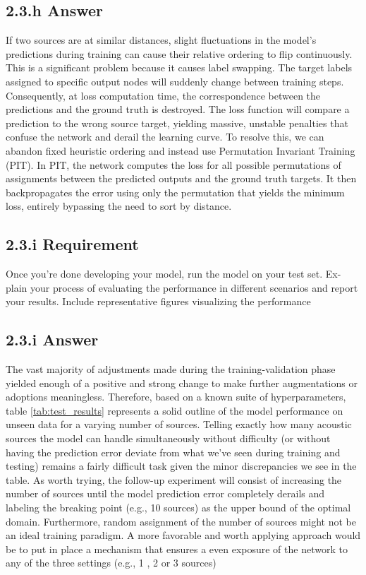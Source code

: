 \documentclass{vgtc}                          %
\begin{document}
\subsection{2.3.h Answer}
If two sources are at similar distances, slight fluctuations in the model's predictions during training can cause their relative ordering to flip continuously. This is a significant problem because it causes label swapping. The target labels assigned to specific output nodes will suddenly change between training steps. Consequently, at loss computation time, the correspondence between the predictions and the ground truth is destroyed. The loss function will compare a prediction to the wrong source target, yielding massive, unstable penalties that confuse the network and derail the learning curve.
To resolve this, we can abandon fixed heuristic ordering and instead use Permutation Invariant Training (PIT). In PIT, the network computes the loss for all possible permutations of assignments between the predicted outputs and the ground truth targets. It then backpropagates the error using only the permutation that yields the minimum loss, entirely bypassing the need to sort by distance.


\subsection{2.3.i Requirement}
Once you’re done developing your model, run the model on your test set. Ex-
plain your process of evaluating the performance in different scenarios and report your
results. Include representative figures visualizing the performance
\subsection{2.3.i Answer}
The vast majority of adjustments made during the training-validation phase yielded enough of a positive and strong change to make further augmentations or adoptions meaningless. Therefore, based on a known suite of hyperparameters, table \ref{tab:test_results} represents a solid outline of the model performance on unseen data for a varying number of sources. Telling exactly how many acoustic sources the model can handle simultaneously without difficulty (or without having the prediction error deviate from what we’ve seen during training and testing) remains a fairly difficult task given the minor discrepancies we see in the table. As worth trying, the follow-up experiment will consist of increasing the number of sources until the model prediction error completely derails and labeling the breaking point (e.g., 10 sources) as the upper bound of the optimal domain. Furthermore, random assignment of the number of sources might not be an ideal training paradigm. A more favorable and worth applying approach would be to put in place a mechanism that ensures a even exposure of the network to any of the three settings (e.g., 1 , 2  or 3 sources)
\end{document}

